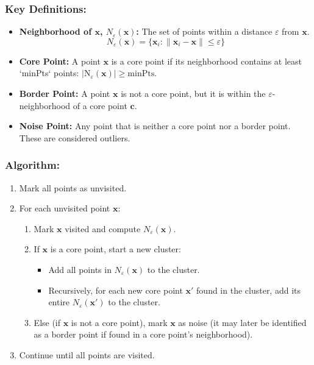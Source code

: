 \documentclass{article}
\begin{document}
\begin{multicols}{2}
	\subsubsection{Key Definitions:}
	\begin{itemize}
		\item \textbf{Neighborhood of $\mathbf{x}$, $N_\varepsilon(\mathbf{x})$:} The set of points within a distance $\varepsilon$ from $\mathbf{x}$.
		      $$
			      N_\varepsilon(\mathbf{x}) = \{ \mathbf{x}_i : \|\mathbf{x}_i - \mathbf{x}\| \le \varepsilon \}
		      $$
		\item \textbf{Core Point:} A point $\mathbf{x}$ is a core point if its neighborhood contains at least `minPts` points: $|\text{N}_\varepsilon(\mathbf{x})| \ge \text{minPts}$.
		\item \textbf{Border Point:} A point $\mathbf{x}$ is not a core point, but it is within the $\varepsilon$-neighborhood of a core point $\mathbf{c}$.
		\item \textbf{Noise Point:} Any point that is neither a core point nor a border point. These are considered outliers.
	\end{itemize}

	\subsubsection{Algorithm:}
	\begin{enumerate}
		\item Mark all points as unvisited.
		\item For each unvisited point $\mathbf{x}$:
		      \begin{enumerate}[label=(\alph*)]
			      \item Mark $\mathbf{x}$ visited and compute $N_\varepsilon(\mathbf{x})$.
			      \item If $\mathbf{x}$ is a core point, start a new cluster:
			            \begin{itemize}
				            \item Add all points in $N_\varepsilon(\mathbf{x})$ to the cluster.
				            \item Recursively, for each new core point $\mathbf{x}'$ found in the cluster, add its entire $N_\varepsilon(\mathbf{x}')$ to the cluster.
			            \end{itemize}
			      \item Else (if $\mathbf{x}$ is not a core point), mark $\mathbf{x}$ as noise (it may later be identified as a border point if found in a core point's neighborhood).
		      \end{enumerate}
		\item Continue until all points are visited.
	\end{enumerate}


\end{multicols}
\end{document}
